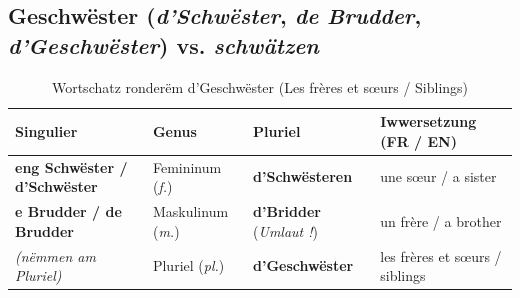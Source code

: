 \subsection{Geschwëster (\textit{d'Schwëster}, \textit{de Brudder}, \textit{d'Geschwëster}) vs. \textit{schwätzen}}

\begin{table}[htbp]
    \centering
    \small
    \begin{tabular}{llll}
        \toprule
        \textbf{Singulier} & \textbf{Genus} & \textbf{Pluriel} & \textbf{Iwwersetzung (FR / EN)} \\
        \midrule
        \textbf{eng Schwëster / d'Schwëster} & Femininum (\textit{f.}) & \textbf{d'Schwësteren} & une sœur / a sister \\
        \textbf{e Brudder / de Brudder} & Maskulinum (\textit{m.}) & \textbf{d'Bridder} (\textit{Umlaut !}) & un frère / a brother \\
        \textit{(nëmmen am Pluriel)} & Pluriel (\textit{pl.}) & \textbf{d'Geschwëster} & les frères et sœurs / siblings \\
        \bottomrule
    \end{tabular}
    \caption{Wortschatz ronderëm d'Geschwëster (Les frères et sœurs / Siblings)}
\end{table}

